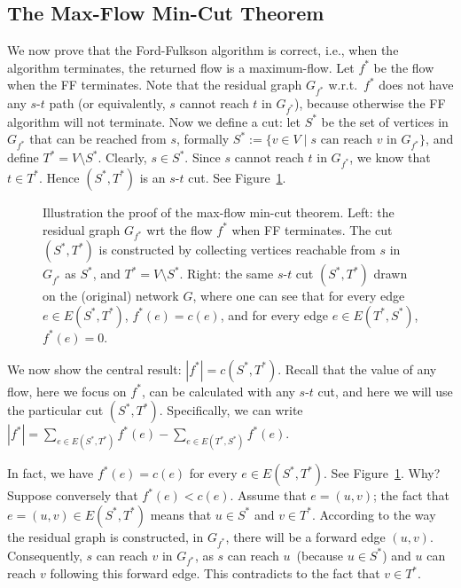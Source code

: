 \subsection*{The Max-Flow Min-Cut Theorem}

We now prove that the Ford-Fulkson algorithm is correct, i.e., when the algorithm terminates,
the returned flow is a maximum-flow.  
Let $f^*$ be the flow when the FF terminates. Note that the residual graph $G_{f^*}$ w.r.t.\ $f^*$ does
not have any $s$-$t$ path (or equivalently, $s$ cannot reach $t$ in $G_{f^*}$), because otherwise the FF algorithm will
not terminate. Now we define a cut: let $S^*$ be the set of vertices in  $G_{f^*}$ that can be reached from $s$, formally 
$S^* := \{v\in V\mid s \textrm{ can reach $v$ in } G_{f^*} \}$,
and define $T^* = V\setminus S^*$.
Clearly, $s\in S^*$.  Since $s$ cannot reach $t$ in $G_{f^*}$, we know that $t\in T^*$. Hence
$(S^*, T^*)$ is an $s$-$t$ cut. See Figure~\ref{fig:theorem}.

\begin{figure}[h]
\centering{}
\caption{Illustration the proof of the max-flow min-cut theorem.
Left: the residual graph $G_{f^*}$ wrt the flow $f^*$ when FF terminates. %
The cut $(S^*,T^*)$ is constructed by collecting vertices reachable from $s$ in $G_{f^*}$ as $S^*$, and $T^*=V\setminus S^*$.
Right: the same $s$-$t$ cut $(S^*, T^*)$ drawn on the (original) network $G$, where one can see that for every edge $e\in E(S^*, T^*)$, $f^*(e) = c(e)$,
and for every edge $e\in E(T^*, S^*)$, $f^*(e) = 0$.}
\label{fig:theorem}
\end{figure}


We now show the central result: $|f^*| = c(S^*,T^*)$. Recall that
the value of any flow, here we focus on $f^*$, can be calculated with any $s$-$t$
cut, and here we will use the particular cut $(S^*,T^*)$.
Specifically, we can write $|f^*| = \sum_{e\in E(S^*, T^*)} f^*(e) - \sum_{e\in E(T^*, S^*)} f^*(e)$.


In fact, we have $f^*(e) = c(e)$ for every $e \in E(S^*,T^*)$. 
See Figure~\ref{fig:theorem}. Why? Suppose conversely that $f^*(e) < c(e)$.
Assume that $e = (u,v)$; the fact that $e = (u,v) \in E(S^*,T^*)$
means that $u \in S^*$ and $v \in T^*$. According to the way the residual graph is constructed, in $G_{f^*}$, there will be
a forward edge $(u,v)$. Consequently, $s$ can reach $v$ in $G_{f^*}$, as $s$ can reach $u$~(because $u\in S^*$) and $u$ can reach 
$v$ following this forward edge. This contradicts to the fact that $v \in T^*$.

